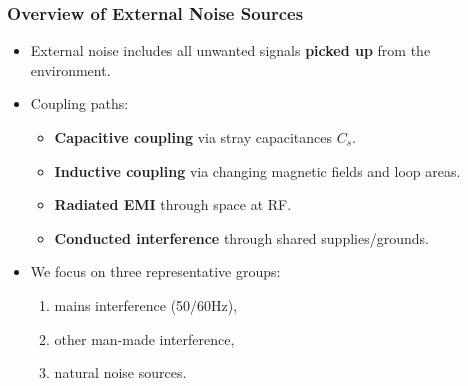 \begin{frame}
	\frametitle{Overview of External Noise Sources}
	\begin{itemize}
	\item External noise includes all unwanted signals \textbf{picked up} from the environment.
	\item Coupling paths:
	\begin{itemize}
		\item \textbf{Capacitive coupling} via stray capacitances $C_s$.
		\item \textbf{Inductive coupling} via changing magnetic fields and loop areas.
		\item \textbf{Radiated EMI} through space at RF.
		\item \textbf{Conducted interference} through shared supplies/grounds.
	\end{itemize}
	\item We focus on three representative groups:
	\begin{enumerate}
		\item mains interference (50/60\unit{Hz}),
		\item other man-made interference,
		\item natural noise sources.
	\end{enumerate}
	\end{itemize}
\end{frame}

